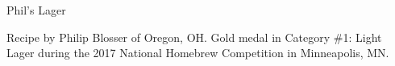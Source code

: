 \begin{recipe}{Phil's Lager}

\begin{aboutblock}
Recipe by Philip Blosser of Oregon, OH. Gold medal in Category \#1: Light Lager
during the 2017 National Homebrew Competition in Minneapolis, MN. \sourceaha
\end{aboutblock}


\begin{methodandtiming}
  
\begin{mashsteps}
\end{mashsteps}

\begin{fermentationsteps}
\end{fermentationsteps}

\end{methodandtiming}

\recipebreak

\begin{ingredientsblock}

\begin{malts}
\end{malts}

\begin{hops}
\end{hops}


\end{ingredientsblock}

\end{recipe}